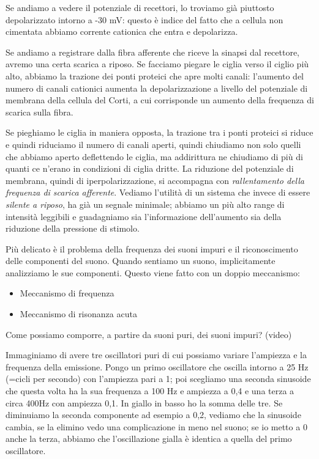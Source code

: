 \documentclass[a4paper,12pt]{article}
\begin{document}
Se andiamo a vedere il potenziale di recettori, lo troviamo già piuttosto depolarizzato intorno a -30 mV: questo è indice del fatto che a cellula non cimentata abbiamo corrente cationica che entra e depolarizza. 

Se andiamo a registrare dalla fibra afferente che riceve la sinapsi dal recettore, avremo una certa scarica a riposo. Se facciamo piegare le ciglia verso il ciglio più alto, abbiamo la trazione dei ponti proteici che apre molti canali: l'aumento del numero di canali cationici aumenta la depolarizzazione a livello del potenziale di membrana della cellula del Corti, a cui corrisponde un aumento della frequenza di scarica sulla fibra. 

Se pieghiamo le ciglia in maniera opposta, la trazione tra i ponti proteici si riduce e quindi riduciamo il numero di canali aperti, quindi chiudiamo non solo quelli che abbiamo aperto deflettendo le ciglia, ma addirittura ne chiudiamo di più di quanti ce n'erano in condizioni di ciglia dritte. La riduzione del potenziale di membrana, quindi di iperpolarizzazione, si accompagna con \emph{rallentamento della frequenza di scarica afferente}. Vediamo l'utilità di un sistema che invece di essere \emph{silente a riposo}, ha già un segnale minimale; abbiamo un più alto range di intensità leggibili e guadagniamo sia l'informazione dell'aumento sia della riduzione della pressione di stimolo. 

Più delicato è il problema della frequenza dei suoni impuri e il riconoscimento delle componenti del suono. Quando 
sentiamo un suono, implicitamente analizziamo le sue componenti. Questo viene fatto con un doppio meccanismo:
\begin{itemize}
\item{Meccanismo di frequenza}
\item{Meccanismo di risonanza acuta}
\end{itemize}

Come possiamo comporre, a partire da suoni puri, dei suoni impuri? 
(video) 

Immaginiamo di avere tre oscillatori puri di cui possiamo variare l'ampiezza e la frequenza della emissione. Pongo un primo oscillatore che oscilla intorno a 25 Hz (=cicli per secondo) con l'ampiezza pari a 1; poi scegliamo una seconda sinusoide che questa volta ha la sua frequenza a 100 Hz e ampiezza a 0,4 e una terza a circa 400Hz con ampiezza 0,1. In giallo in basso ho la somma delle tre. Se diminuiamo la seconda componente ad esempio a 0,2, vediamo che la sinusoide cambia, se la elimino vedo una complicazione in meno nel suono; se io metto a 0 anche la terza, abbiamo che l'oscillazione gialla è identica a quella del primo oscillatore. 
\end{document}

